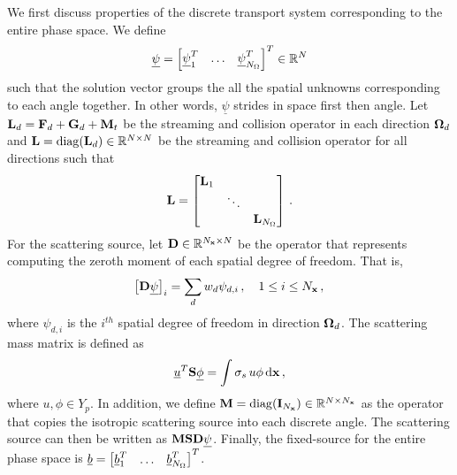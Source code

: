 \documentclass[../doc.tex]{subfiles}
\begin{document}
We first discuss properties of the discrete transport system corresponding to the entire phase space. We define 
	\begin{equation}
		\underline{\psi} = \begin{bmatrix} \underline{\psi}_1^T & \ldots & \underline{\psi}_{N_\Omega}^T \end{bmatrix}^T \in \mathbb{R}^N 
	\end{equation}
such that the solution vector groups the all the spatial unknowns corresponding to each angle together. In other words, $\underline{\psi}$ strides in space first then angle. 
Let $\boldsymbol{\mathrm{L}}_d = \boldsymbol{\mathrm{F}}_d + \boldsymbol{\mathrm{G}}_d + \boldsymbol{\mathrm{M}}_t$ be the streaming and collision operator in each direction $\boldsymbol{\Omega}_d$ and $\boldsymbol{\mathrm{L}} = \operatorname{diag}(\boldsymbol{\mathrm{L}}_d) \in \mathbb{R}^{N\times N}$ be the streaming and collision operator for all directions such that 
	\begin{equation}
		\boldsymbol{\mathrm{L}} = \begin{bmatrix} 
			\boldsymbol{\mathrm{L}}_1 \\ 
			& \ddots \\
			&& \boldsymbol{\mathrm{L}}_{N_\Omega}
		\end{bmatrix} \,. 
	\end{equation}
For the scattering source, let $\boldsymbol{\mathrm{D}} \in \mathbb{R}^{N_{\boldsymbol{\mathrm{x}}} \times N}$ be the operator that represents computing the zeroth moment of each spatial degree of freedom. That is, 
	\begin{equation}
		\!\left[ \boldsymbol{\mathrm{D}}\underline{\psi} \right]_i = \sum_d w_d \psi_{d,i} \,, \quad 1 \leq i\leq N_{\boldsymbol{\mathrm{x}}} \,,
	\end{equation}
where $\psi_{d,i}$ is the $i^{th}$ spatial degree of freedom in direction $\boldsymbol{\Omega}_d$. The scattering mass matrix is defined as 
	\begin{equation}
		\underline{u}^T \boldsymbol{\mathrm{S}} \underline{\phi} = \int \sigma_s\, u\phi \mathop{}\!\mathrm{d} \boldsymbol{\mathrm{x}} \,, 
	\end{equation}
where $u,\phi \in Y_p$. In addition, we define $\boldsymbol{\mathrm{M}} = \operatorname{diag}(\boldsymbol{\mathrm{I}}_{N_{\boldsymbol{\mathrm{x}}}})\in \mathbb{R}^{N \times N_{\boldsymbol{\mathrm{x}}}}$ as the operator that copies the isotropic scattering source into each discrete angle. The scattering source can then be written as $\boldsymbol{\mathrm{M}}\boldsymbol{\mathrm{S}}\boldsymbol{\mathrm{D}} \underline{\psi}$. Finally, the fixed-source for the entire phase space is $\underline{b} = \begin{bmatrix} \underline{b}_1^T & \ldots & \underline{b}_{N_\Omega}^T \end{bmatrix}^T$. 
\end{document}
